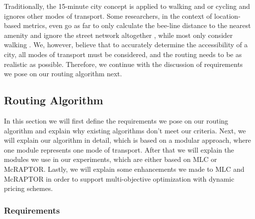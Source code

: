 Traditionally, the 15-minute city concept is applied to walking and or cycling and ignores other modes of transport.
Some researchers, in the context of location-based metrics, even go as far to only calculate the bee-line distance to the nearest amenity and ignore the street network altogether \cite{gastnerOptimalDesignSpatial2006}, while most only consider walking \cite{olivariAreItalianCities2023, nicolettiDisadvantagedCommunitiesHave2023}.
We, however, believe that to accurately determine the accessibility of a city, all modes of transport must be considered, and the routing needs to be as realistic as possible.
Therefore, we continue with the discussion of requirements we pose on our routing algorithm next.


\subsection{Routing Algorithm}
\label{subs:routing_algorithm}

In this section we will first define the requirements we pose on our routing algorithm and explain why existing algorithms don't meet our criteria.
Next, we will explain our algorithm in detail, which is based on a modular approach, where one module represents one mode of transport.
After that we will explain the modules we use in our experiments, which are either based on MLC or McRAPTOR.
Lastly, we will explain some enhancements we made to MLC and McRAPTOR in order to support multi-objective optimization with dynamic pricing schemes.

\subsubsection{Requirements}
\label{subsubsec:requirements}


